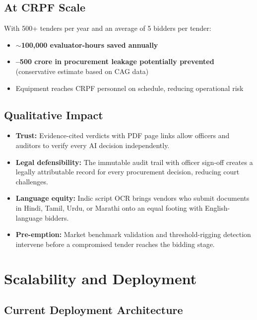 \documentclass[12pt,a4paper]{article}
\begin{document}
\subsection{At CRPF Scale}

With 500+ tenders per year and an average of 5 bidders per tender:
\begin{itemize}
\item \textbf{$\sim$100,000 evaluator-hours saved annually}
\item \textbf{--500 crore in procurement leakage potentially prevented}
    (conservative estimate based on CAG data)
\item Equipment reaches CRPF personnel on schedule, reducing operational risk
\end{itemize}

\subsection{Qualitative Impact}

\begin{itemize}
\item \textbf{Trust:} Evidence-cited verdicts with PDF page links allow officers
    and auditors to verify every AI decision independently.
\item \textbf{Legal defensibility:} The immutable audit trail with officer
    sign-off creates a legally attributable record for every procurement decision,
    reducing court challenges.
\item \textbf{Language equity:} Indic script OCR brings vendors who submit
    documents in Hindi, Tamil, Urdu, or Marathi onto an equal footing with
    English-language bidders.
\item \textbf{Pre-emption:} Market benchmark validation and threshold-rigging
    detection intervene before a compromised tender reaches the bidding stage.
\end{itemize}

\section{Scalability and Deployment}

\subsection{Current Deployment Architecture}
\end{document}
